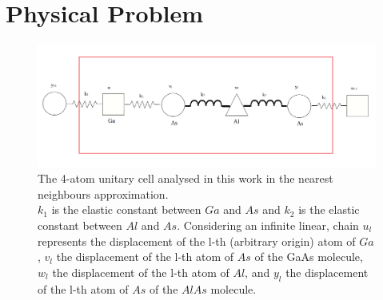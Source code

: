 \documentclass{article}
\begin{document}
	\section*{Physical Problem}

\begin{figure}
	\centering
	\includegraphics[width=0.7\linewidth]{cella.png}
	\caption{The 4-atom unitary cell analysed in this work in the nearest neighbours approximation.\\
	$k_1$ is the elastic constant between $Ga$ and $As$ and $k_2$ is the elastic constant between $Al$ and $As$. Considering an infinite linear, chain $u_l$ represents the displacement of the l-th (arbitrary origin) atom of $Ga$, $v_l$ the displacement of the l-th atom of $As$ of the GaAs molecule, $w_l$ the displacement of the l-th atom of $Al$, and  $y_l$ the displacement of the l-th atom of $As$ of the $AlAs$ molecule.   }
	\label{fig:cella}
\end{figure}
\end{document}
